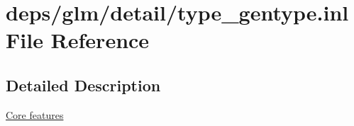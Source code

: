 \hypertarget{type__gentype_8inl}{}\section{deps/glm/detail/type\+\_\+gentype.inl File Reference}
\label{type__gentype_8inl}


\subsection{Detailed Description}
\hyperlink{group__core}{Core features} 